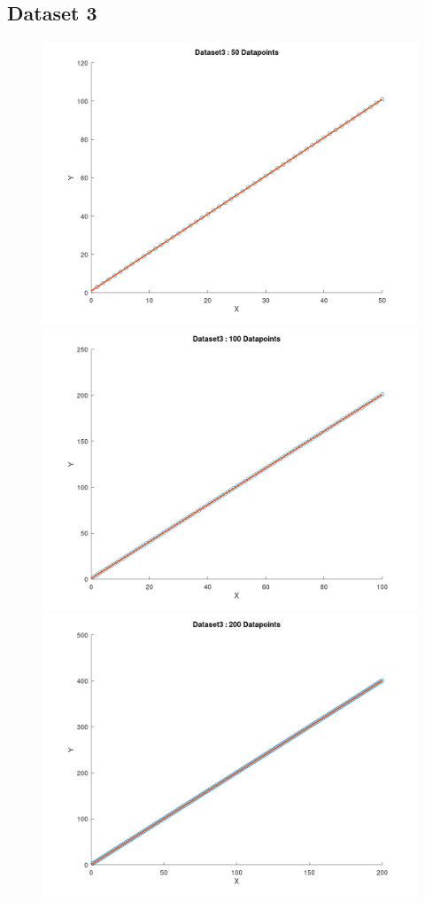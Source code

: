 \documentclass{article}
\begin{document}
\subsection{Dataset 3}
\begin{figure} [!ht]
	\includegraphics[width=.55\textwidth]{D3-50.png}\hfill
	\includegraphics[width=.55\textwidth]{D3-100.png}\hfill
	\includegraphics[width=1\textwidth]{D3-200.png}
	\label{fig:plots3}
\end{figure}
\end{document}
